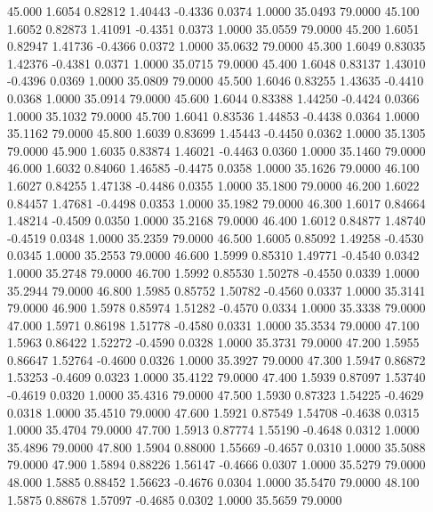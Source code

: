   45.000   1.6054   0.82812   1.40443  -0.4336   0.0374   1.0000  35.0493  79.0000
  45.100   1.6052   0.82873   1.41091  -0.4351   0.0373   1.0000  35.0559  79.0000
  45.200   1.6051   0.82947   1.41736  -0.4366   0.0372   1.0000  35.0632  79.0000
  45.300   1.6049   0.83035   1.42376  -0.4381   0.0371   1.0000  35.0715  79.0000
  45.400   1.6048   0.83137   1.43010  -0.4396   0.0369   1.0000  35.0809  79.0000
  45.500   1.6046   0.83255   1.43635  -0.4410   0.0368   1.0000  35.0914  79.0000
  45.600   1.6044   0.83388   1.44250  -0.4424   0.0366   1.0000  35.1032  79.0000
  45.700   1.6041   0.83536   1.44853  -0.4438   0.0364   1.0000  35.1162  79.0000
  45.800   1.6039   0.83699   1.45443  -0.4450   0.0362   1.0000  35.1305  79.0000
  45.900   1.6035   0.83874   1.46021  -0.4463   0.0360   1.0000  35.1460  79.0000
  46.000   1.6032   0.84060   1.46585  -0.4475   0.0358   1.0000  35.1626  79.0000
  46.100   1.6027   0.84255   1.47138  -0.4486   0.0355   1.0000  35.1800  79.0000
  46.200   1.6022   0.84457   1.47681  -0.4498   0.0353   1.0000  35.1982  79.0000
  46.300   1.6017   0.84664   1.48214  -0.4509   0.0350   1.0000  35.2168  79.0000
  46.400   1.6012   0.84877   1.48740  -0.4519   0.0348   1.0000  35.2359  79.0000
  46.500   1.6005   0.85092   1.49258  -0.4530   0.0345   1.0000  35.2553  79.0000
  46.600   1.5999   0.85310   1.49771  -0.4540   0.0342   1.0000  35.2748  79.0000
  46.700   1.5992   0.85530   1.50278  -0.4550   0.0339   1.0000  35.2944  79.0000
  46.800   1.5985   0.85752   1.50782  -0.4560   0.0337   1.0000  35.3141  79.0000
  46.900   1.5978   0.85974   1.51282  -0.4570   0.0334   1.0000  35.3338  79.0000
  47.000   1.5971   0.86198   1.51778  -0.4580   0.0331   1.0000  35.3534  79.0000
  47.100   1.5963   0.86422   1.52272  -0.4590   0.0328   1.0000  35.3731  79.0000
  47.200   1.5955   0.86647   1.52764  -0.4600   0.0326   1.0000  35.3927  79.0000
  47.300   1.5947   0.86872   1.53253  -0.4609   0.0323   1.0000  35.4122  79.0000
  47.400   1.5939   0.87097   1.53740  -0.4619   0.0320   1.0000  35.4316  79.0000
  47.500   1.5930   0.87323   1.54225  -0.4629   0.0318   1.0000  35.4510  79.0000
  47.600   1.5921   0.87549   1.54708  -0.4638   0.0315   1.0000  35.4704  79.0000
  47.700   1.5913   0.87774   1.55190  -0.4648   0.0312   1.0000  35.4896  79.0000
  47.800   1.5904   0.88000   1.55669  -0.4657   0.0310   1.0000  35.5088  79.0000
  47.900   1.5894   0.88226   1.56147  -0.4666   0.0307   1.0000  35.5279  79.0000
  48.000   1.5885   0.88452   1.56623  -0.4676   0.0304   1.0000  35.5470  79.0000
  48.100   1.5875   0.88678   1.57097  -0.4685   0.0302   1.0000  35.5659  79.0000
